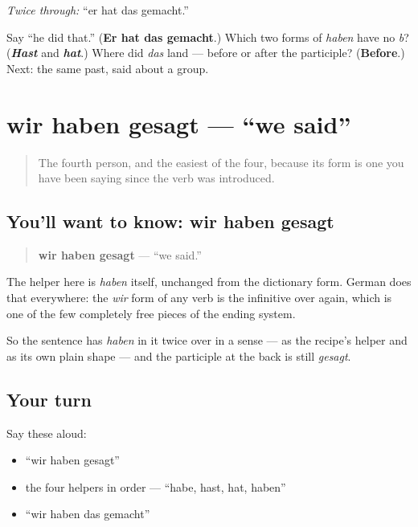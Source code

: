 \emph{Twice through:} \textquotedblleft{}er hat das gemacht.\textquotedblright{}

\begin{tcolorbox}[breakable,colback=teal!4,colframe=teal!35!black,title={Before you move on}]
Say \textquotedblleft{}he did that.\textquotedblright{} (\textbf{Er hat das gemacht}.) Which two forms of \emph{haben} have no \emph{b}? (\emph{\textbf{Hast}} and \emph{\textbf{hat}}.) Where did \emph{das} land — before or after the participle? (\textbf{Before}.) Next: the same past, said about a group.
\end{tcolorbox}
\section[wir haben gesagt]{wir haben gesagt — \textquotedblleft{}we said\textquotedblright{}}

\label{lesson:GE-C15-wir-haben-gesagt}



\begin{quote}
The fourth person, and the easiest of the four, because its form is one you have been saying since the verb was introduced.
\end{quote}

\subsection*{You'll want to know: wir haben gesagt}
\begin{quote}
\textbf{wir haben gesagt} — \textquotedblleft{}we said.\textquotedblright{}
\end{quote}

The helper here is \emph{haben} itself, unchanged from the dictionary form. German does that everywhere: the \emph{wir} form of any verb is the infinitive over again, which is one of the few completely free pieces of the ending system.

So the sentence has \emph{haben} in it twice over in a sense — as the recipe's helper and as its own plain shape — and the participle at the back is still \emph{gesagt}.

\subsection*{Your turn}
Say these aloud:

\begin{itemize}
\raggedright
  \item \textquotedblleft{}wir haben gesagt\textquotedblright{}
  \item the four helpers in order — \textquotedblleft{}habe, hast, hat, haben\textquotedblright{}
  \item \textquotedblleft{}wir haben das gemacht\textquotedblright{}
\end{itemize}


